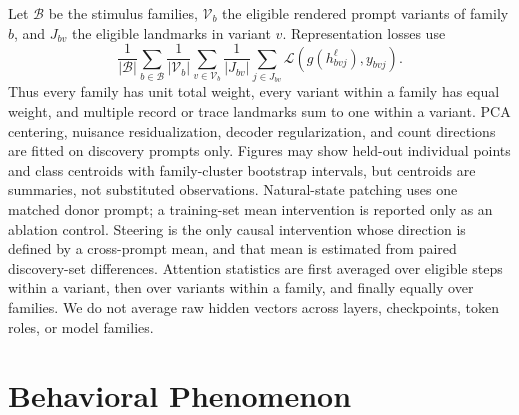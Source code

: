 \documentclass[10pt,twocolumn]{article}
\begin{document}
Let $\mathcal B$ be the stimulus families, $\mathcal V_b$ the eligible rendered prompt variants
of family $b$, and $J_{bv}$ the eligible landmarks in variant $v$. Representation losses use
\[
 \frac{1}{|\mathcal B|}\sum_{b\in\mathcal B}
 \frac{1}{|\mathcal V_b|}\sum_{v\in\mathcal V_b}
 \frac{1}{|J_{bv}|}\sum_{j\in J_{bv}}
 \mathcal L\!\left(g(h_{bvj}^\ell),y_{bvj}\right).
\]
Thus every family has unit total weight, every variant within a family has equal weight, and
multiple record or trace landmarks sum to one within a variant. PCA centering, nuisance
residualization, decoder
regularization, and count directions are fitted on discovery prompts only. Figures may show
held-out individual points and class centroids with family-cluster bootstrap intervals, but
centroids are summaries, not substituted observations. Natural-state patching uses one matched
donor prompt; a training-set mean intervention is reported only as an ablation control.
Steering is the only causal intervention whose direction is defined by a cross-prompt mean, and
that mean is estimated from paired discovery-set differences. Attention statistics are first
averaged over eligible steps within a variant, then over variants within a family, and finally
equally over families. We do not average raw hidden vectors across layers, checkpoints, token
roles, or model families.

\section{Behavioral Phenomenon}
\end{document}
